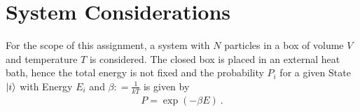 \section{System Considerations}
For the scope of this assignment, a system with $N$ particles in a box of volume $V$ and temperature $T$ is considered.
The closed box is placed in an external heat bath, hence the total energy is not fixed and the probability $P_i$ for a given State $\ket{i}$ with Energy $E_i$ and $\beta \mathrel{\mathop:}= \frac{1}{kT}$ is given by
\begin{align}
	P = \exp\left(-\beta E\right)~.
\end{align}
